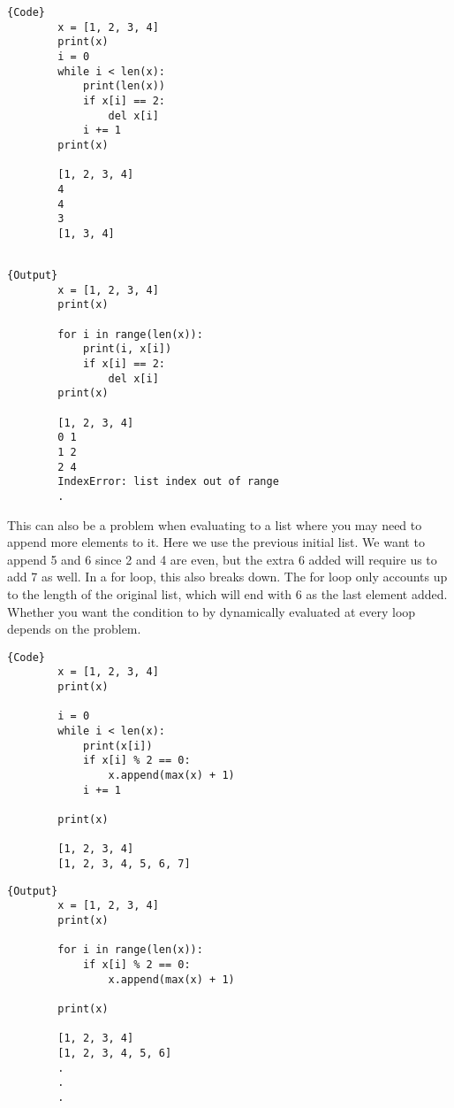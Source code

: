\documentclass{article}
\begin{document}
      \noindent\begin{minipage}{.5\textwidth}
      \begin{lstlisting}[]{Code}
        x = [1, 2, 3, 4]
        print(x)
        i = 0
        while i < len(x): 
            print(len(x))
            if x[i] == 2: 
                del x[i]
            i += 1
        print(x)

        [1, 2, 3, 4]
        4
        4
        3
        [1, 3, 4]
        
      \end{lstlisting}
      \end{minipage}
      \hfill
      \begin{minipage}{.49\textwidth}
      \begin{lstlisting}[]{Output}
        x = [1, 2, 3, 4]
        print(x) 

        for i in range(len(x)):
            print(i, x[i])
            if x[i] == 2: 
                del x[i]
        print(x)

        [1, 2, 3, 4]
        0 1
        1 2
        2 4
        IndexError: list index out of range
        .
      \end{lstlisting}
      \end{minipage}

      This can also be a problem when evaluating to a list where you may need to append more elements to it. Here we use the previous initial list. We want to append 5 and 6 since 2 and 4 are even, but the extra 6 added will require us to add 7 as well.   In a for loop, this also breaks down. The for loop only accounts up to the length of the original list, which will end with 6 as the last element added. Whether you want the condition to by dynamically evaluated at every loop depends on the problem. 

      \noindent\begin{minipage}{.5\textwidth}
      \begin{lstlisting}[]{Code}
        x = [1, 2, 3, 4] 
        print(x)

        i = 0 
        while i < len(x): 
            print(x[i])
            if x[i] % 2 == 0: 
                x.append(max(x) + 1) 
            i += 1

        print(x)

        [1, 2, 3, 4]
        [1, 2, 3, 4, 5, 6, 7] 
      \end{lstlisting}
      \end{minipage}
      \hfill
      \begin{minipage}{.49\textwidth}
      \begin{lstlisting}[]{Output}
        x = [1, 2, 3, 4]
        print(x)

        for i in range(len(x)): 
            if x[i] % 2 == 0: 
                x.append(max(x) + 1) 

        print(x)

        [1, 2, 3, 4]
        [1, 2, 3, 4, 5, 6]
        .
        .
        .
      \end{lstlisting}
      \end{minipage}
\end{document}

